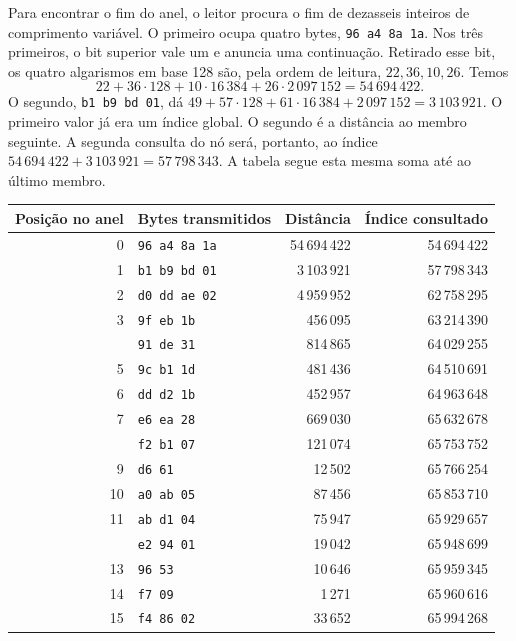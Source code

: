 Para encontrar o fim do anel, o leitor procura o fim de dezasseis
inteiros de comprimento variável. O primeiro ocupa quatro bytes,
\texttt{96 a4 8a 1a}. Nos três primeiros, o bit superior vale um e
anuncia uma continuação. Retirado esse bit, os quatro algarismos em
base 128 são, pela ordem de leitura, \(22,36,10,26\). Temos
\[
 22+36\cdot128+10\cdot16\,384+26\cdot2\,097\,152
       =54\,694\,422.
\]
O segundo, \texttt{b1 b9 bd 01}, dá
\(49+57\cdot128+61\cdot16\,384+2\,097\,152=3\,103\,921\).
O primeiro valor já era um índice global. O segundo é a distância
ao membro seguinte. A segunda consulta do nó será, portanto, ao índice
\(54\,694\,422+3\,103\,921=57\,798\,343\).
A tabela segue esta mesma soma até ao último membro.

\begin{center}\small
\begin{tabular}{r l r r}
\toprule
Posição no anel & Bytes transmitidos & Distância & Índice consultado\\
\midrule
0 & \texttt{96 a4 8a 1a} & 54\,694\,422 & 54\,694\,422\\
1 & \texttt{b1 b9 bd 01} & 3\,103\,921 & 57\,798\,343\\
2 & \texttt{d0 dd ae 02} & 4\,959\,952 & 62\,758\,295\\
3 & \texttt{9f eb 1b} & 456\,095 & 63\,214\,390\\
\addlinespace[2pt]
4 & \texttt{91 de 31} & 814\,865 & 64\,029\,255\\
5 & \texttt{9c b1 1d} & 481\,436 & 64\,510\,691\\
6 & \texttt{dd d2 1b} & 452\,957 & 64\,963\,648\\
7 & \texttt{e6 ea 28} & 669\,030 & 65\,632\,678\\
\addlinespace[2pt]
8 & \texttt{f2 b1 07} & 121\,074 & 65\,753\,752\\
9 & \texttt{d6 61} & 12\,502 & 65\,766\,254\\
10 & \texttt{a0 ab 05} & 87\,456 & 65\,853\,710\\
11 & \texttt{ab d1 04} & 75\,947 & 65\,929\,657\\
\addlinespace[2pt]
12 & \texttt{e2 94 01} & 19\,042 & 65\,948\,699\\
13 & \texttt{96 53} & 10\,646 & 65\,959\,345\\
14 & \texttt{f7 09} & 1\,271 & 65\,960\,616\\
15 & \texttt{f4 86 02} & 33\,652 & 65\,994\,268\\
\bottomrule
\end{tabular}
\end{center}

